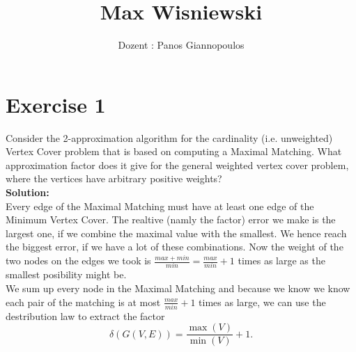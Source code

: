 \documentclass[11pt,a4paper,ngerman]{article}
\date{}
\title{Max Wisniewski}
\author{Dozent : Panos Giannopoulos}
\begin{document}

\renewcommand{\figurename}{Figure}

\maketitle
\thispagestyle{fancy}


\section*{Exercise 1}

Consider the 2-approximation algorithm for the cardinality (i.e. unweighted) Vertex Cover problem that is based on computing a Maximal Matching. What approximation factor does it give for the general weighted vertex cover problem, where the vertices have arbitrary positive weights?\\

\textbf{Solution:}\\
Every edge of the Maximal Matching must have at least one edge of the Minimum Vertex Cover. The realtive (namly the factor) error we make is the largest one, if we combine the maximal value with the smallest. We hence reach the biggest error, if we have a lot of these combinations.
Now the weight of the two nodes on the edges we took is $\frac{max+min}{min} = \frac{max}{min}+1$ times as large as the smallest posibility might be.\\
We sum up every node in the Maximal Matching and because we know we know each pair of the matching is at most $\frac{max}{min}+1$ times as large, we can use the destribution law to extract the factor 
$$
	\delta (G(V,E)) = \frac{\max (V)}{\min (V)} + 1.
$$
\end{document}
